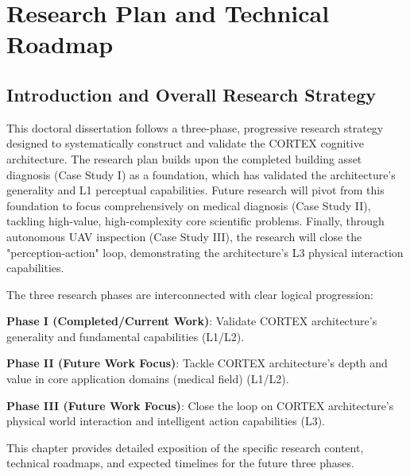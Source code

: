 
\chapter{Research Plan and Technical Roadmap} \label{chp:research-plan}


\section{Introduction and Overall Research Strategy}

This doctoral dissertation follows a three-phase, progressive research strategy designed to systematically construct and validate the CORTEX cognitive architecture. The research plan builds upon the completed building asset diagnosis (Case Study I) as a foundation, which has validated the architecture's generality and L1 perceptual capabilities. Future research will pivot from this foundation to focus comprehensively on medical diagnosis (Case Study II), tackling high-value, high-complexity core scientific problems. Finally, through autonomous UAV inspection (Case Study III), the research will close the "perception-action" loop, demonstrating the architecture's L3 physical interaction capabilities.

The three research phases are interconnected with clear logical progression:

\textbf{Phase I (Completed/Current Work)}: Validate CORTEX architecture's generality and fundamental capabilities (L1/L2).

\textbf{Phase II (Future Work Focus)}: Tackle CORTEX architecture's depth and value in core application domains (medical field) (L1/L2).

\textbf{Phase III (Future Work Focus)}: Close the loop on CORTEX architecture's physical world interaction and intelligent action capabilities (L3).

This chapter provides detailed exposition of the specific research content, technical roadmaps, and expected timelines for the future three phases.

